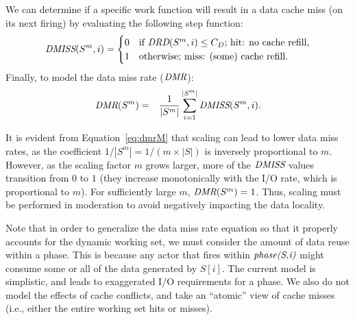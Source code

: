 \documentclass{sigplanconf}
\newcommand{\mt}[1]{\mbox{\it #1}}
\begin{document}
We can determine if a
specific work function will result in a data cache miss (on its next
firing) by evaluating the following step function:
\begin{equation}
\label{eq:dmiss}
  \mt{DMISS}(S^m,i) =
    \begin{cases}
      0& \text{if $\mt{DRD}(S^m,i) \leq C_D$; hit: no cache refill,}\\
      1& \text{otherwise; miss: (some) cache refill.}
    \end{cases}
\end{equation}
Finally, to model the data miss rate ($\mt{DMR}$):
\begin{eqnarray}
  \label{eq:dmrM}
  \mt{DMR}(S^m) &=& \frac{1}{|S^m|}\sum_{i=1}^{|S^m|} \mt{DMISS}(S^m,i).
\end{eqnarray}

It is evident from Equation~\ref{eq:dmrM} that scaling can lead to
lower data miss rates, as the coefficient $1/|S^m| = 1/(m \times |S|)$
is inversely proportional to $m$.  However, as the scaling factor $m$
grows larger, more of the $\mt{DMISS}$ values transition from $0$ to
$1$ (they increase monotonically with the I/O rate, which is
proportional to $m$).  For sufficiently large $m$, $\mt{DMR}(S^m) =
1$.  Thus, scaling must be performed in moderation to avoid negatively
impacting the data locality.

Note that in order to generalize the data miss rate equation so that it properly
accounts for the dynamic working set, we must consider the amount of
data reuse within a phase. This is because any actor that fires within
$\mt{phase(S,i)}$ might consume some or all of the data
generated by $S[i]$. The current model is simplistic, and leads to
exaggerated I/O requirements for a phase. We also do not model the
effects of cache conflicts, and take an ``atomic'' view of cache
misses (i.e., either the entire working set hits or misses).



\end{document}
